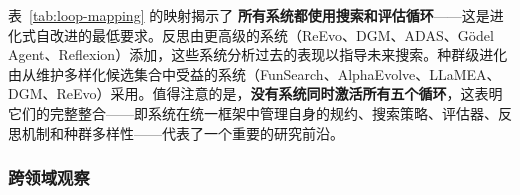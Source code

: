 \begin{table}[htbp]
\centering
{}
\caption{映射到五大进化循环框架。所有系统都使用搜索和评估循环；高级系统增加了反思。约一半的系统使用种群级进化（维护多样化的候选集合）。没有系统同时激活所有五个循环——它们的整合代表了研究前沿。}
\label{tab:loop-mapping}
\end{table}

表~\ref{tab:loop-mapping} 的映射揭示了 \textbf{所有系统都使用搜索和评估循环}——这是进化式自改进的最低要求。反思由更高级的系统（ReEvo、DGM、ADAS、G\"{o}del Agent、Reflexion）添加，这些系统分析过去的表现以指导未来搜索。种群级进化由从维护多样化候选集合中受益的系统（FunSearch、AlphaEvolve、LLaMEA、DGM、ReEvo）采用。值得注意的是，\textbf{没有系统同时激活所有五个循环}，这表明它们的完整整合——即系统在统一框架中管理自身的规约、搜索策略、评估器、反思机制和种群多样性——代表了一个重要的研究前沿。


\subsubsection{跨领域观察}

